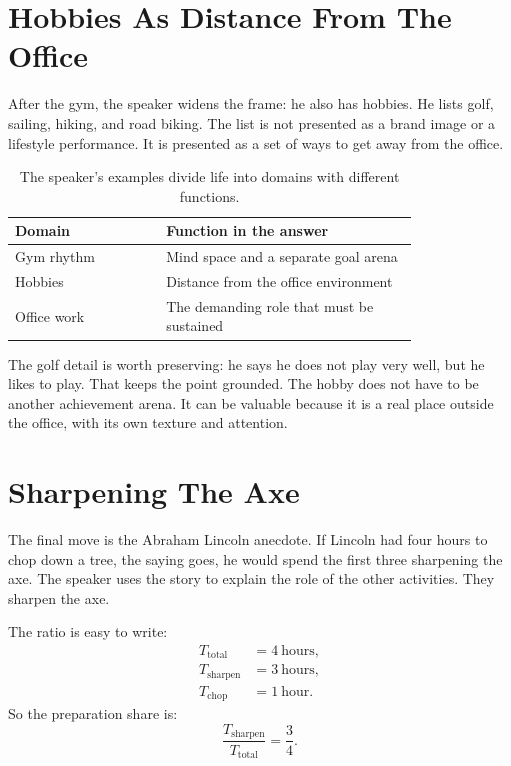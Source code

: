 \section{Hobbies As Distance From The Office}

After the gym, the speaker widens the frame: he also has hobbies. He lists golf, sailing, hiking, and road biking. The list is not presented as a brand image or a lifestyle performance. It is presented as a set of ways to get away from the office.

\begin{table}
\centering
\begin{tabular}{p{0.30\linewidth} p{0.50\linewidth}}
\hline
Domain & Function in the answer \\
\hline
Gym rhythm & Mind space and a separate goal arena \\
Hobbies & Distance from the office environment \\
Office work & The demanding role that must be sustained \\
\hline
\end{tabular}
\caption{The speaker's examples divide life into domains with different functions.}
\end{table}

The golf detail is worth preserving: he says he does not play very well, but he likes to play. That keeps the point grounded. The hobby does not have to be another achievement arena. It can be valuable because it is a real place outside the office, with its own texture and attention.

\section{Sharpening The Axe}

The final move is the Abraham Lincoln anecdote. If Lincoln had four hours to chop down a tree, the saying goes, he would spend the first three sharpening the axe. The speaker uses the story to explain the role of the other activities. They sharpen the axe.

The ratio is easy to write:
\begin{align}
T_{\mathrm{total}}   &= 4\ \text{hours},\\
T_{\mathrm{sharpen}} &= 3\ \text{hours},\\
T_{\mathrm{chop}}    &= 1\ \text{hour}.
\end{align}
So the preparation share is:
\begin{equation}
\frac{T_{\mathrm{sharpen}}}{T_{\mathrm{total}}}
=
\frac{3}{4}.
\end{equation}

